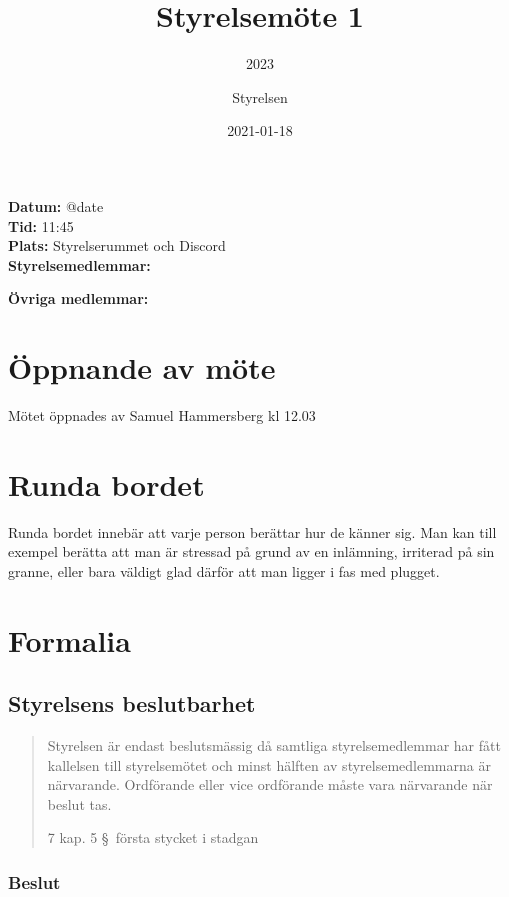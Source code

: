 \documentclass[protokoll]{dvd}
\begin{document}
\title{Styrelsemöte 1}
\subtitle{2023}
\author{Styrelsen}
\date{2021-01-18}

\textbf{Datum:} \csname @date\endcsname\\
\textbf{Tid:} 11:45\\
\textbf{Plats:} Styrelserummet och Discord\\
\textbf{Styrelsemedlemmar:}
\begin{närvarande_förtroendevalda}
\end{närvarande_förtroendevalda}

\textbf{Övriga medlemmar:} \\


\section{Öppnande av möte}

Mötet öppnades av Samuel Hammersberg kl 12.03

\section{Runda bordet}

Runda bordet innebär att varje person berättar hur de känner sig.
Man kan till exempel berätta att man är stressad på grund av en inlämning, irriterad på sin granne, eller bara väldigt glad därför att man ligger i fas med plugget.

\section{Formalia}

\subsection{Styrelsens beslutbarhet}

\blockquote[7 kap. 5 \S~första stycket i stadgan][]{%
    Styrelsen är endast beslutsmässig då samtliga styrelsemedlemmar har fått kallelsen till styrelsemötet och minst hälften av styrelsemedlemmarna är närvarande.
    Ordförande eller vice ordförande måste vara närvarande när beslut tas.
}

\subsubsection*{Beslut}
\end{document}
